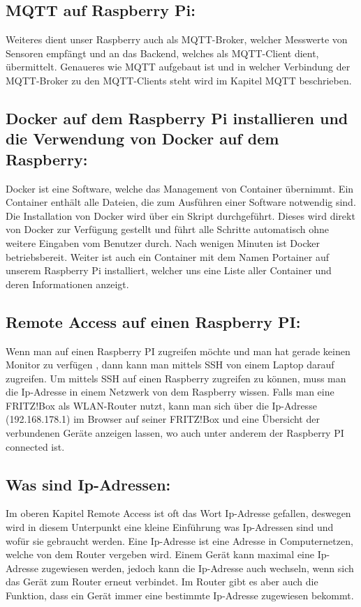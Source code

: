 \subsection {MQTT auf Raspberry Pi:}
Weiteres dient unser Raspberry auch als MQTT-Broker, welcher Messwerte von Sensoren empfängt und an das Backend, welches als MQTT-Client dient, übermittelt. 
Genaueres wie MQTT aufgebaut ist und in welcher Verbindung der MQTT-Broker zu den MQTT-Clients steht wird im Kapitel MQTT beschrieben.

\subsection {Docker auf dem Raspberry Pi installieren und die Verwendung von Docker auf dem Raspberry:}

Docker ist eine Software, welche das Management von Container übernimmt. Ein Container enthält alle Dateien, die zum Ausführen einer Software notwendig sind. 
Die Installation von Docker wird über ein Skript durchgeführt. 
Dieses wird direkt von Docker zur Verfügung gestellt und führt alle Schritte automatisch ohne weitere Eingaben vom Benutzer durch. 
Nach wenigen Minuten ist Docker betriebsbereit. 
Weiter ist auch ein Container mit dem Namen Portainer auf unserem Raspberry Pi installiert, welcher uns eine Liste aller Container und deren Informationen anzeigt.
 


\subsection {Remote Access auf einen Raspberry PI:}
Wenn man auf einen Raspberry PI zugreifen möchte und man hat gerade keinen Monitor zu verfügen , dann kann man mittels SSH von einem Laptop darauf zugreifen.
 Um mittels SSH auf einen Raspberry zugreifen zu können, muss man die Ip-Adresse in einem Netzwerk von dem Raspberry wissen. 
 Falls man eine FRITZ!Box als WLAN-Router nutzt, kann man sich über die Ip-Adresse (192.168.178.1) im Browser auf seiner FRITZ!Box und eine Übersicht der verbundenen Geräte anzeigen lassen, wo auch unter anderem der Raspberry PI connected ist. 

 \subsection{Was sind Ip-Adressen:}
Im oberen Kapitel Remote Access ist oft das Wort Ip-Adresse gefallen, deswegen wird in diesem Unterpunkt eine kleine Einführung was Ip-Adressen sind und wofür sie gebraucht werden. 
Eine Ip-Adresse ist eine Adresse in Computernetzen, welche von dem Router vergeben wird.
 Einem Gerät kann maximal eine Ip-Adresse zugewiesen werden, jedoch kann die Ip-Adresse auch wechseln, wenn sich das Gerät zum Router erneut verbindet. 
 Im Router gibt es aber auch die Funktion, dass ein Gerät immer eine bestimmte Ip-Adresse zugewiesen bekommt. 






